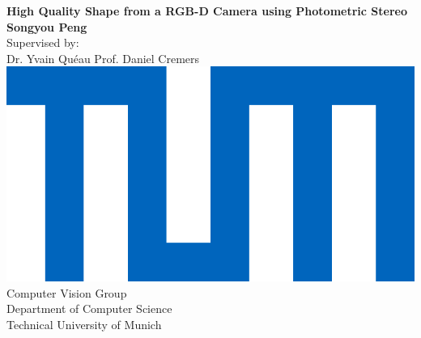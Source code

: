 
\newpage
\thispagestyle{empty}


\vspace*{-2cm}
\begin{center}
{\LARGE\bf  High Quality Shape from a RGB-D Camera using Photometric Stereo\\} \vspace{2cm} {\Large \textbf{Songyou Peng}}\\
\vspace{1.5cm}
{
\large 
Supervised by:\\ \vspace{0.4cm}
 Dr. Yvain Qu\'eau \hspace{0.8cm} Prof. Daniel Cremers
}
\\\vspace{0.8cm}
{
\includegraphics[height=0.15\textheight]{figures/tum_logo.jpg}
\\\vspace{0.8cm}
\large
Computer Vision Group \\
\vspace{0.4cm}
Department of Computer Science\\
\vspace{0.4cm}
Technical University of Munich}

\end{center}

